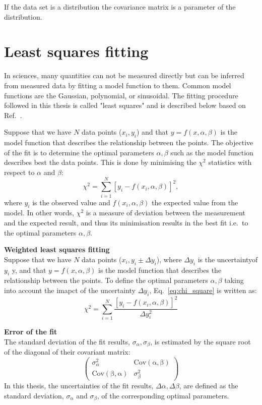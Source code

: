 If the data set is a distribution the covariance matrix is a parameter of the distribution.


\section{Least squares fitting}\label{app:non_linear_fitting}
In sciences, many quantities can not be measured directly but can be inferred from measured data by fitting a model function to them. Common model functions are the Gaussian, polynomial, or sinusoidal. The fitting procedure followed in this thesis is called "least squares" and is described below based on Ref.~\cite{least_square_minimisation}.

Suppose that we have $N$ data points ($x_{i}, y_{i}$) and that $y=f(x,\alpha, \beta)$ is the model function that describes the relationship between the points. The objective of the fit is to determine the optimal parameters $\alpha, \beta$ such as the model function describes best the data points. This is done by minimising the $\chi^2$ statistics with respect to $\alpha$ and $\beta$:
\begin{equation}\label{eq:chi_square}
    \chi^2 = \sum_{i=1}^{N}[y_{i}-f(x_{i},\alpha, \beta)]^2,
\end{equation}
where $y_{i}$ is the observed value and $f(x_{i},\alpha, \beta)$ the expected value from the model. In other words, $\chi^2$ is a measure of deviation between the measurement and the expected result, and thus its minimisation results in the best fit i.e.\ to the optimal parameters $\alpha, \beta$.

\normalsize{\textbf{Weighted least squares fitting}}\\
Suppose that we have $N$ data points ($x_i, y_i \pm \Delta y_i $), where $ \Delta y_i$ is the uncertaintyof $y_i$ y, and that $y=f(x,\alpha, \beta)$ is the model function that describes the relationship between the points. To define the optimal parameters $\alpha, \beta$ taking into account the imapct of the uncertainty $\Delta y_i$, Eq.~\eqref{eq:chi_square} is written as:
\begin{equation}\label{eq:chi_square_weights}
    \chi^2 = \sum_{i=1}^{N}\frac{[y_{i}-f(x_{i},\alpha, \beta)]^2}{\Delta y_i^2}
\end{equation}

\normalsize{\textbf{Error of the fit}}\\
The standard deviation of the fit results, $\sigma_\alpha, \sigma_\beta$, is estimated by the square root of the diagonal of their covariant matrix:
\begin{equation}\label{eq:cov_matrix_fit_results}
    \begin{pmatrix}
        \sigma_{\alpha}^2 & \mathrm{Cov(\alpha, \beta)}\\
        \mathrm{Cov(\beta, \alpha)} & \sigma_{\beta}^2
        \end{pmatrix}
\end{equation}
In this thesis, the uncertainties of the fit results, $\Delta \alpha, \Delta \beta$, are defined as the standard deviation, $\sigma_{\alpha}$ and  $\sigma_{\beta}$, of the corresponding optimal parameters.

